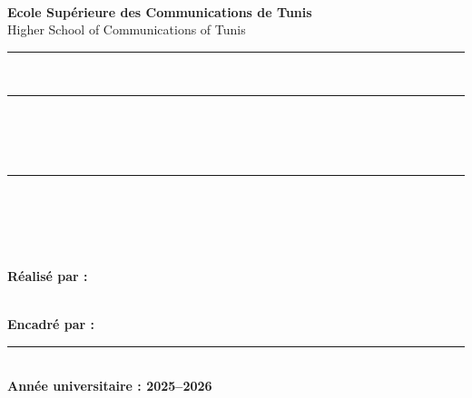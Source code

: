 \documentclass[11pt,a4paper]{article}
\begin{document}
\begin{titlepage}
    \centering
    \vspace*{-1cm}
    
    {\large\textbf{\color{navyblue}{SUP'COM}}} \\
    \vspace{0.2cm}
    {\small\textbf{Ecole Supérieure des Communications de Tunis}} \\
    {\small Higher School of Communications of Tunis} \\
    \vspace{0.3cm}
    \rule{6cm}{1pt} \\
    
    \vspace{2.5cm}
    
    \rule{\linewidth}{1.5pt} \\[0.4cm]
    {\Huge\bfseries\color{navyblue}{Projet de Préparation Métier}} \\
    \vspace{0.2cm}
    {\large\bfseries\color{darkgray}{P2M}} \\
    \rule{\linewidth}{1.5pt} \\
    
    \vspace{2cm}
    
    {\Large\bfseries\color{darkgray}{[Saisir le titre du projet ici]}} \\[0.3cm]
    {\large\itshape\color{teal}{[Sous-titre ou description du projet]}} \\
    
    \vspace{3.5cm}
    
    \begin{minipage}[t]{0.45\textwidth}
        \flushleft
        \textbf{Réalisé par :}\\
        {\large\color{navyblue}{[Prénom Nom Étudiant 1]}} \\
        {\large\color{navyblue}{[Prénom Nom Étudiant 2]}}
    \end{minipage}
    \hfill
    \begin{minipage}[t]{0.45\textwidth}
        \flushright
        \textbf{Encadré par :}\\
        {\large\color{navyblue}{[Prénom Nom de l'Encadrant]}}
    \end{minipage}
    
    \vfill
    
    \rule{8cm}{0.4pt} \\
    \vspace{0.3cm}
    {\large\textbf{Année universitaire : 2025--2026}}
\end{titlepage}
\end{document}
